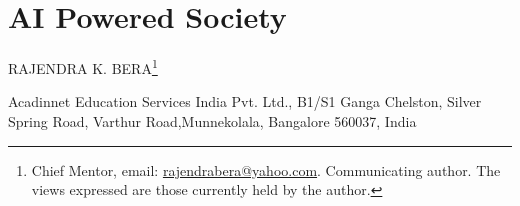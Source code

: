 \chapter{AI Powered Society}


\begin{center}
{\uppercase{Rajendra K. Bera}\footnote{Chief Mentor, email: \url{rajendrabera@yahoo.com}. Communicating author. The views expressed are those currently held by
the author.}}
\smallskip

Acadinnet Education Services India Pvt. Ltd., B1/S1 Ganga Chelston, Silver Spring Road, Varthur Road,\break Munnekolala, Bangalore 560037, India
\end{center}
\vskip 4cm

\noindent{}

\newpage

